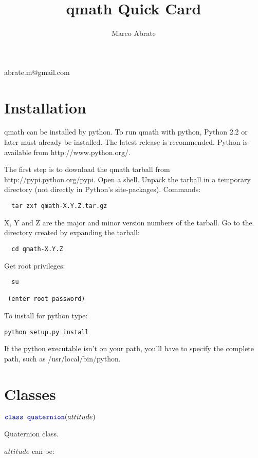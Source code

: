 \documentclass[11pt]{paper}
\begin{document}
\setcounter{page}{1}

\title{qmath Quick Card}
\author{Marco Abrate} 
\maketitle
\vskip-0.6cm
\noindent \small{abrate.m@gmail.com}




\tableofcontents

\section{Installation}
qmath can be installed by python. To run qmath with python, Python 2.2 or later must already be installed. The latest release is recommended. Python is available from http://www.python.org/.

The first step is to download the qmath tarball from http://pypi.python.org/pypi.
Open a shell. Unpack the tarball in a temporary directory (not directly in Python's site-packages). Commands:
\begin{verbatim}
  tar zxf qmath-X.Y.Z.tar.gz
\end{verbatim}
X, Y and Z are the major and minor version numbers of the tarball.
Go to the directory created by expanding the tarball:
\begin{verbatim}
  cd qmath-X.Y.Z
\end{verbatim}
Get root privileges:
\begin{verbatim}
  su
 
 (enter root password)
\end{verbatim}
To install for python type:
\begin{verbatim}
python setup.py install
\end{verbatim}
If the python executable isn't on your path, you'll have to specify the complete path, such as /usr/local/bin/python.

\bigskip

\section{Classes}

\noindent $\textcolor{blue}{\texttt{class quaternion}}(attitude)$

\noindent Quaternion class. 

\noindent $attitude$ can be:
\end{document}
